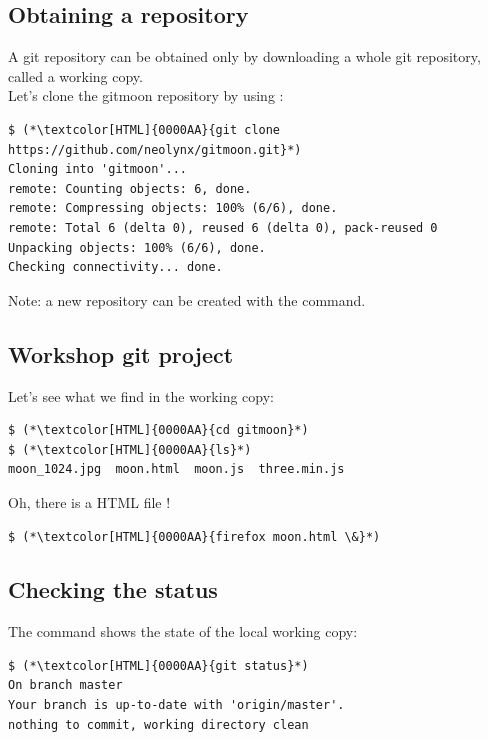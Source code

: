 \subsection{Obtaining a repository}
\begin{frame}[fragile]
  \subslidetitle
  A git repository can be obtained only by downloading a whole git repository,
  called a working copy.
  \\
  \vspace{1em}
  Let's clone the gitmoon repository by using :
  \begin{lstlisting}
$ (*\textcolor[HTML]{0000AA}{git clone https://github.com/neolynx/gitmoon.git}*)
Cloning into 'gitmoon'...
remote: Counting objects: 6, done.
remote: Compressing objects: 100% (6/6), done.
remote: Total 6 (delta 0), reused 6 (delta 0), pack-reused 0
Unpacking objects: 100% (6/6), done.
Checking connectivity... done.
\end{lstlisting}

  \vspace{1em}
  Note: a new repository can be created with the  command.
\end{frame}

\subsection{Workshop git project}
\begin{frame}[fragile]
  \subslidetitle
  Let's see what we find in the working copy:
  \begin{lstlisting}
$ (*\textcolor[HTML]{0000AA}{cd gitmoon}*)
$ (*\textcolor[HTML]{0000AA}{ls}*)
moon_1024.jpg  moon.html  moon.js  three.min.js
\end{lstlisting}

  \vspace{1em}
  Oh, there is a HTML file !
  \begin{lstlisting}
$ (*\textcolor[HTML]{0000AA}{firefox moon.html \&}*)
\end{lstlisting}
\end{frame}

\subsection{Checking the status}
\begin{frame}[fragile]
  \subslidetitle

  The command  shows the state of the local working copy:
  \begin{lstlisting}
$ (*\textcolor[HTML]{0000AA}{git status}*)
On branch master
Your branch is up-to-date with 'origin/master'.
nothing to commit, working directory clean
\end{lstlisting}
\end{frame}

